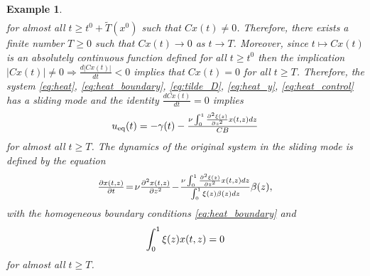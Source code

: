 \documentclass{article}
\newtheorem{example}{Example}
\begin{document}
{\begin{example}
\[\begin{split}
\end{split}
\]
for almost all $t\geq t^0+\tilde T(x^0)$ such that $Cx(t)\neq 0$. 
Therefore,  there exists a finite number $T\geq 0$ such that $Cx(t)\to 0$ as $t\to T$. Moreover, since  $t\mapsto Cx(t)$ is an absolutely continuous function defined for all $t\geq t^0$ then the implication 
$|Cx(t)|\neq0 \Rightarrow \frac{d |Cx(t)|}{dt}<0$ implies that $Cx(t)=0$ for all $t\geq T$.
Therefore, the system \eqref{eq:heat}, \eqref{eq:heat_boundary}, \eqref{eq:tilde_D}, \eqref{eq:heat_y}, \eqref{eq:heat_control} has a sliding mode and the identity  $\frac{dCx(t)}{d t}=0$ implies  \vspace{-1mm}
  \[
 u_{\rm eq}(t)=-\gamma(t)-\tfrac{\nu \int^1_0  \frac{\partial^2 \xi(z)}{\partial z^2} x(t,z)dz}{CB} \vspace{-1mm}
 \]
 for almost all  $t\geq T$. The dynamics of the original system in the sliding mode is defined by the equation \vspace{-1mm}
 \begin{equation}\label{eq:heam_SMC_dynamics1}
\tfrac{\partial x(t,z)}{\partial t}\!=\!\nu\tfrac{\partial^2 x(t,z)}{\partial z^2}\!-\!\tfrac{\nu \int^1_0 \frac{\partial^2 \xi(z)}{\partial z^2} x(t,z)dz}{\int^1_0 \xi(z)\beta(z)dz}\beta(z), 
 \vspace{-1mm}%
 \end{equation}
with the homogeneous boundary conditions \eqref{eq:heat_boundary} and  \vspace{-1mm}
\begin{equation}\label{eq:heam_SMC_dynamics2}
\int^1_0 \xi(z) x(t,z)=0 \vspace{-1mm}
\end{equation}
for almost all $ t\geq T$.


\end{example}}
\end{document}

